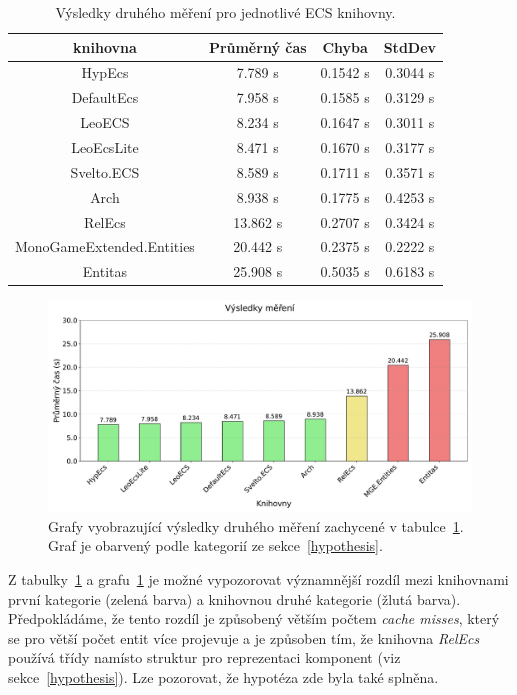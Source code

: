\begin{table}[!htb]
    \centering\footnotesize\sf
    \begin{tabular}{c c c c}
        \toprule
        knihovna & Průměrný čas & Chyba & StdDev \\
        \midrule
        HypEcs & 7.789 s & 0.1542 s & 0.3044 s \\
        DefaultEcs & 7.958 s & 0.1585 s & 0.3129 s \\
        LeoECS & 8.234 s & 0.1647 s & 0.3011 s \\
        LeoEcsLite & 8.471 s & 0.1670 s & 0.3177 s \\
        Svelto.ECS & 8.589 s & 0.1711 s & 0.3571 s \\
        Arch & 8.938 s & 0.1775 s & 0.4253 s \\
        RelEcs & 13.862 s & 0.2707 s & 0.3424 s \\
        MonoGameExtended.Entities & 20.442 s & 0.2375 s & 0.2222 s \\
        Entitas & 25.908 s & 0.5035 s & 0.6183 s \\
        \bottomrule
    \end{tabular}
    \caption{Výsledky druhého měření pro jednotlivé ECS knihovny.}
    \label{tab:second-benchmark-results}
\end{table}

\begin{figure}[!htb]
    \centering
    \includegraphics[width=1.0\linewidth]{plots/second_benchmark_results.pdf}
    \caption{Grafy vyobrazující výsledky druhého měření zachycené v tabulce~\ref{tab:second-benchmark-results}. Graf je obarvený podle kategorií ze sekce~\ref{hypothesis}.}
    \label{fig:second-benchmark-results}
\end{figure}

Z tabulky~\ref{tab:second-benchmark-results} a grafu~\ref{fig:second-benchmark-results} je možné vypozorovat významnější rozdíl mezi knihovnami první kategorie (zelená barva) a knihovnou druhé kategorie (žlutá barva). Předpokládáme, že tento rozdíl je způsobený větším počtem \textit{cache misses}, který se pro větší počet entit více projevuje a je způsoben tím, že knihovna \textit{RelEcs} používá třídy namísto struktur pro reprezentaci komponent (viz sekce~\ref{hypothesis}). Lze pozorovat, že hypotéza zde byla také splněna.

